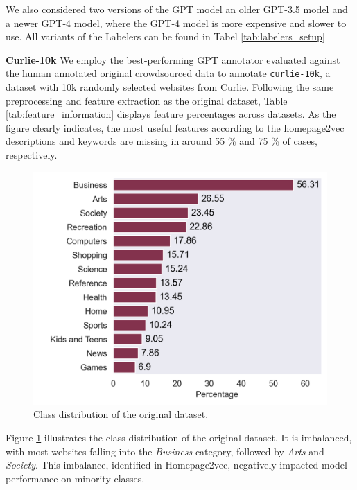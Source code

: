 We also considered two versions of the GPT model an older GPT-3.5 model and a newer GPT-4 model, where the GPT-4 model is more expensive and slower to use.
All variants of the Labelers can be found in Tabel \ref{tab:labelers_setup}


\textbf{Curlie-10k} 
We employ the best-performing GPT annotator evaluated against the human annotated original crowdsourced data to annotate \texttt{curlie-10k}, a dataset with 10k randomly selected websites from Curlie. 
Following the same preprocessing and feature extraction as the original dataset, Table \ref{tab:feature_information} displays feature percentages across datasets. 
As the figure clearly indicates, the most useful features according to the homepage2vec \cite{homepage2vec} descriptions and keywords are missing in around 55 \% and 75 \% of cases, respectively. 

\begin{figure}[!ht]
    \centering
    \includegraphics[width=1\columnwidth]{figures/category_distribution.png}
    \caption{Class distribution of the original dataset.}
    \label{fig:class_distribution}
\end{figure}
Figure \ref{fig:class_distribution} illustrates the class distribution of the original dataset. It is imbalanced, with most websites falling into the \textit{Business} category, followed by \textit{Arts} and \textit{Society}. This imbalance, identified in Homepage2vec, negatively impacted model performance on minority classes.


